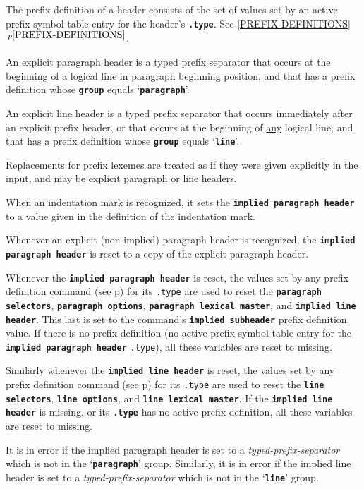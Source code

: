 \documentclass[12pt]{article}
\newcommand{\TT}[1]{{\tt \bfseries #1}}
\newcommand{\itemref}[1]{\ref{#1}$\,^{p\pageref{#1}}$}
\newcommand{\pagref}[1]{p\pageref{#1}}
\begin{document}
The prefix definition of a header consists of the set of values
set by an active prefix symbol table entry
for the header's \TT{.type}.
See \itemref{PREFIX-DEFINITIONS}.

An explicit paragraph header is a typed prefix separator that
occurs at the beginning of a logical line in paragraph beginning
position, and that has a prefix definition whose \TT{group} equals
`\TT{paragraph}'.

An explicit line header is a typed prefix separator that
occurs immediately after an explicit prefix header, or that
occurs at the beginning of \underline{any} logical line,
and that has a prefix definition whose \TT{group} equals
`\TT{line}'.

Replacements for prefix lexemes are treated
as if they were given explicitly in the input, and may be explicit
paragraph or line headers.

When an indentation mark is recognized, it sets the \TT{implied paragraph
header} to a value given in the definition of the indentation mark.

Whenever an explicit (non-implied) paragraph header is recognized,
the \TT{implied paragraph header} is reset to a copy of the
explicit paragraph header.

Whenever the \TT{implied paragraph header} is reset, the values
set by any prefix definition command (see \pagref{PARSER-PREFIX-COMMAND})
for its {\tt .type} are used to reset the \TT{paragraph selectors},
\TT{paragraph options}, \TT{paragraph lexical master}, and
\TT{implied line header}.  This last is set to the command's
\TT{implied subheader} prefix definition value.
If there is no prefix definition (no active prefix symbol table
entry for the \TT{implied paragraph header} {\tt.type}),
all these variables are reset to missing.

Similarly whenever the \TT{implied line header} is reset, the values
set by any prefix definition command (see \pagref{PARSER-PREFIX-COMMAND})
for its {\tt .type} are used to reset the \TT{line selectors},
\TT{line options}, and \TT{line lexical master}.  If the \TT{implied
line header} is missing, or its \TT{.type} has
no active prefix definition,
all these variables are reset to missing.

It is in error if the implied paragraph header is set to a
{\em typed-prefix-separator} which is not in the `\TT{paragraph}'
group.  Similarly, it is in error if the implied line header is set to a
{\em typed-prefix-separator} which is not in the `\TT{line}' group.
\end{document}
